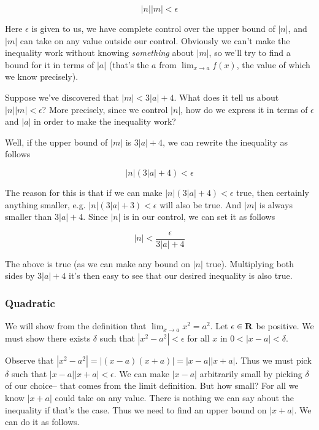 \[|n||m|<\epsilon\]

Here $\epsilon$ is given to us, we have complete control over the upper bound
of $|n|$, and $|m|$ can take on any value outside our control.
Obviously we can't make the inequality work without knowing
\textit{something} about $|m|$, so we'll try to find a bound for it in
terms of $|a|$ (that's the $a$ from $\lim_{x\to a}f(x)$, the value of
which we know precisely).

\vs

Suppose we've discovered that $|m|<3|a|+4$. What does it tell us about
$|n||m|<\epsilon$? More precisely, since we control $|n|$, how do we express
it in terms of $\epsilon$ and $|a|$ in order to make the inequality work?

\vs

Well, if the upper bound of $|m|$ is $3|a|+4$, we can rewrite the
inequality as follows

\[|n|(3|a|+4)<\epsilon\]

The reason for this is that if we can make $|n|(3|a|+4)<\epsilon$ true, then
certainly anything smaller, e.g. $|n|(3|a|+3)<\epsilon$ will also be true.
And $|m|$ is always smaller than $3|a|+4$. Since $|n|$ is in our
control, we can set it as follows

\[|n|<\frac{\epsilon}{3|a|+4}\]

The above is true (as we can make any bound on $|n|$ true).
Multiplying both sides by $3|a|+4$ it's then easy to see that our
desired inequality is also true.

\subsubsection{Quadratic}

We will show from the definition that $\lim_{x\to a}x^2=a^2$. Let
$\epsilon\in\mathbf{R}$ be positive. We must show there exists $\delta$ such that
$|x^2-a^2|<\epsilon$ for all $x$ in $0<|x-a|<\delta$.

\vs

Observe that $|x^2-a^2|=|(x-a)(x+a)|=|x-a||x+a|$. Thus we must pick
$\delta$ such that $|x-a||x+a|<\epsilon$. We can make $|x-a|$ arbitrarily small by
picking $\delta$ of our choice-- that comes from the limit definition. But
how small? For all we know $|x+a|$ could take on any value. There is
nothing we can say about the inequality if that's the case. Thus we
need to find an upper bound on $|x+a|$. We can do it as follows.

\vs

